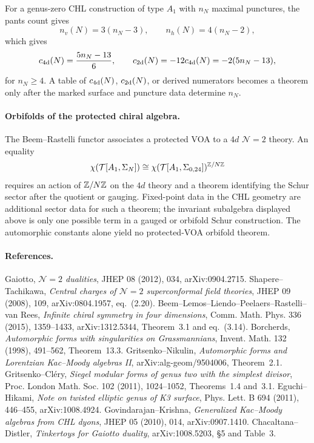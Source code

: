For a genus-zero CHL construction of type \(A_1\) with \(n_N\) maximal
punctures, the pants count gives
\[
  n_v(N)=3(n_N-3),\qquad n_h(N)=4(n_N-2),
\]
which gives
\[
  c_{\mathrm{4d}}(N)=\frac{5n_N-13}{6},\qquad
  c_{\mathrm{2d}}(N)=-12c_{\mathrm{4d}}(N)=-2(5n_N-13),
\]
for \(n_N\ge 4\).  A table of \(c_{\mathrm{4d}}(N)\), \(c_{\mathrm{2d}}(N)\), or derived
numerators becomes a theorem only after the marked surface and puncture
data determine \(n_N\).

\paragraph{Orbifolds of the protected chiral algebra.}
The Beem--Rastelli functor associates a protected VOA to a \(4d\)
\(\mathcal{N}=2\) theory.  An equality
\[
  \chi(\mathcal{T}[A_1,\Sigma_N])
  \cong
  \chi(\mathcal{T}[A_1,\Sigma_{0,24}])^{\mathbb{Z}/N\mathbb{Z}}
\]
requires an action of \(\mathbb{Z}/N\mathbb{Z}\) on the \(4d\) theory and a theorem
identifying the Schur sector after the quotient or gauging.  Fixed-point
data in the CHL geometry are additional sector data for such a theorem;
the invariant subalgebra displayed above is only one possible term in a
gauged or orbifold Schur construction.  The automorphic constants alone
yield no protected-VOA orbifold theorem.

\paragraph{References.}
Gaiotto, \emph{\(\mathcal{N}=2\) dualities}, JHEP 08 (2012), 034,
arXiv:0904.2715.  Shapere--Tachikawa, \emph{Central charges of
\(\mathcal{N}=2\) superconformal field theories}, JHEP 09 (2008), 109,
arXiv:0804.1957, eq.~(2.20).  Beem--Lemos--Liendo--Peelaers--Rastelli--van Rees,
\emph{Infinite chiral symmetry in four dimensions}, Comm. Math. Phys.
336 (2015), 1359--1433, arXiv:1312.5344, Theorem~3.1 and eq.~(3.14).
Borcherds, \emph{Automorphic forms with singularities on Grassmannians},
Invent. Math. 132 (1998), 491--562, Theorem~13.3.
Gritsenko--Nikulin, \emph{Automorphic forms and Lorentzian Kac--Moody
algebras II}, arXiv:alg-geom/9504006, Theorem~2.1.  Gritsenko--Cl\'ery,
\emph{Siegel modular forms of genus two with the simplest divisor},
Proc. London Math. Soc. 102 (2011), 1024--1052, Theorems~1.4 and~3.1.
Eguchi--Hikami, \emph{Note on twisted elliptic genus of K3 surface},
Phys. Lett. B 694 (2011), 446--455, arXiv:1008.4924.
Govindarajan--Krishna, \emph{Generalized Kac--Moody algebras from CHL
dyons}, JHEP 05 (2010), 014, arXiv:0907.1410.  Chacaltana--Distler,
\emph{Tinkertoys for Gaiotto duality}, arXiv:1008.5203, \S5 and Table~3.
